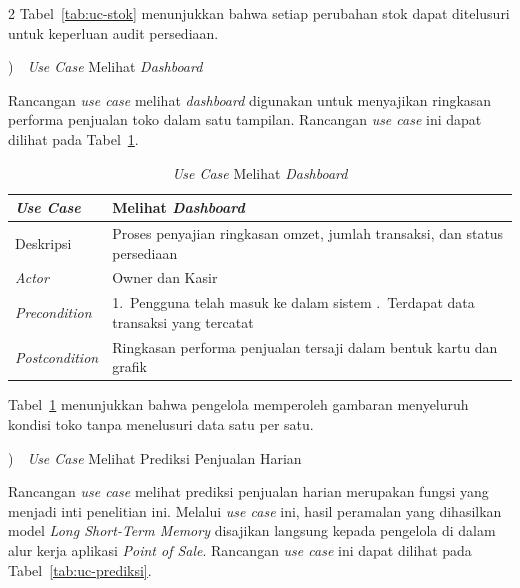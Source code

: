 \documentclass[12pt, a4paper, onecolumn, oneside]{report}
\begin{document}
\begin{spacing}{2}
Tabel~\ref{tab:uc-stok} menunjukkan bahwa setiap perubahan stok dapat ditelusuri untuk keperluan audit persediaan.

)~~\textit{Use Case} Melihat \textit{Dashboard}

Rancangan \textit{use case} melihat \textit{dashboard} digunakan untuk menyajikan ringkasan performa penjualan toko dalam satu tampilan. Rancangan \textit{use case} ini dapat dilihat pada Tabel~\ref{tab:uc-dashboard}.

\begin{table}[H]
\centering
\caption{\textit{Use Case} Melihat \textit{Dashboard}}
\label{tab:uc-dashboard}
\begin{tabularx}{\textwidth}{|p{3.2cm}|X|}
\hline
\textbf{\textit{Use Case}} & \textbf{Melihat \textit{Dashboard}} \\ \hline
Deskripsi & Proses penyajian ringkasan omzet, jumlah transaksi, dan status persediaan \\ \hline
\textit{Actor} & Owner dan Kasir \\ \hline
\textit{Precondition} & 1.~Pengguna telah masuk ke dalam sistem \newline 2.~Terdapat data transaksi yang tercatat \\ \hline
\textit{Postcondition} & Ringkasan performa penjualan tersaji dalam bentuk kartu dan grafik \\ \hline
\end{tabularx}
\end{table}

Tabel~\ref{tab:uc-dashboard} menunjukkan bahwa pengelola memperoleh gambaran menyeluruh kondisi toko tanpa menelusuri data satu per satu.

)~~\textit{Use Case} Melihat Prediksi Penjualan Harian

Rancangan \textit{use case} melihat prediksi penjualan harian merupakan fungsi yang menjadi inti penelitian ini. Melalui \textit{use case} ini, hasil peramalan yang dihasilkan model \textit{Long Short-Term Memory} disajikan langsung kepada pengelola di dalam alur kerja aplikasi \textit{Point of Sale}. Rancangan \textit{use case} ini dapat dilihat pada Tabel~\ref{tab:uc-prediksi}.


\end{spacing}
\end{document}
